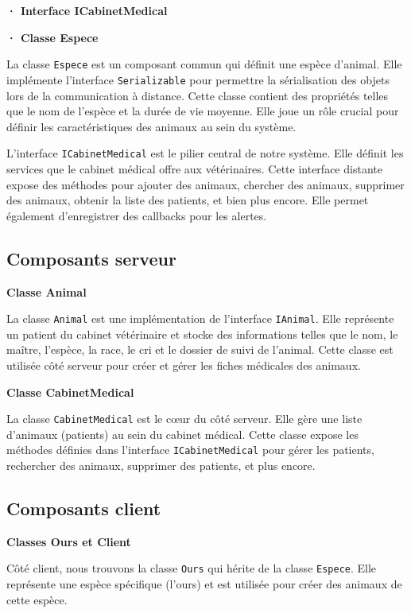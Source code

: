 \documentclass{article} %
\begin{document}
\textbf{· Interface ICabinetMedical}
\bigskip

\textbf{· Classe Espece}
\bigskip

La classe \texttt{Espece} est un composant commun qui définit une espèce d'animal. Elle implémente l'interface \texttt{Serializable} pour permettre la sérialisation des objets lors de la communication à distance. Cette classe contient des propriétés telles que le nom de l'espèce et la durée de vie moyenne. Elle joue un rôle crucial pour définir les caractéristiques des animaux au sein du système.

L'interface \texttt{ICabinetMedical} est le pilier central de notre système. Elle définit les services que le cabinet médical offre aux vétérinaires. Cette interface distante expose des méthodes pour ajouter des animaux, chercher des animaux, supprimer des animaux, obtenir la liste des patients, et bien plus encore. Elle permet également d'enregistrer des callbacks pour les alertes.

\subsection{Composants serveur}

\textbf{Classe Animal}
\bigskip


La classe \texttt{Animal} est une implémentation de l'interface \texttt{IAnimal}. Elle représente un patient du cabinet vétérinaire et stocke des informations telles que le nom, le maître, l'espèce, la race, le cri et le dossier de suivi de l'animal. Cette classe est utilisée côté serveur pour créer et gérer les fiches médicales des animaux.

\textbf{Classe CabinetMedical}
\bigskip


La classe \texttt{CabinetMedical} est le cœur du côté serveur. Elle gère une liste d'animaux (patients) au sein du cabinet médical. Cette classe expose les méthodes définies dans l'interface \texttt{ICabinetMedical} pour gérer les patients, rechercher des animaux, supprimer des patients, et plus encore.

\subsection{Composants client}

\textbf{Classes Ours et Client}
\bigskip

Côté client, nous trouvons la classe \texttt{Ours} qui hérite de la classe \texttt{Espece}. Elle représente une espèce spécifique (l'ours) et est utilisée pour créer des animaux de cette espèce.
\end{document}
